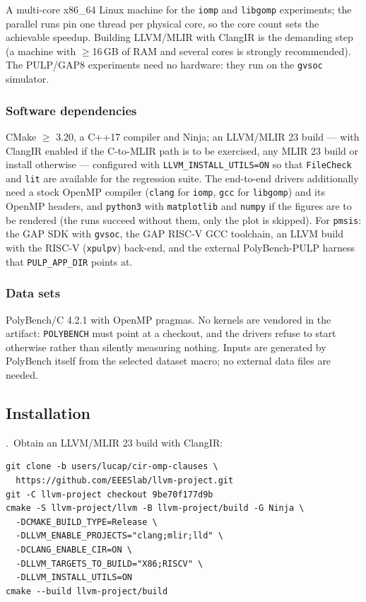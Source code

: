 A multi-core x86\_64 Linux machine for the \texttt{iomp} and \texttt{libgomp}
experiments; the parallel runs pin one thread per physical core, so the core
count sets the achievable speedup.  Building LLVM/MLIR with ClangIR is the
demanding step (a machine with $\geq$16\,GB of RAM and several cores is
strongly recommended).  The PULP/GAP8 experiments need no hardware: they run on
the \texttt{gvsoc} simulator.

\subsubsection{Software dependencies}

CMake $\geq$ 3.20, a C++17 compiler and Ninja; an LLVM/MLIR 23 build ---
with ClangIR enabled if the C-to-MLIR path is to be exercised, any MLIR 23
build or install otherwise --- configured with \texttt{LLVM\_INSTALL\_UTILS=ON}
so that \texttt{FileCheck} and \texttt{lit} are available for the regression
suite.  The end-to-end drivers additionally need a stock OpenMP compiler
(\texttt{clang} for \texttt{iomp}, \texttt{gcc} for \texttt{libgomp}) and its
OpenMP headers, and \texttt{python3} with \texttt{matplotlib} and
\texttt{numpy} if the figures are to be rendered (the runs succeed without
them, only the plot is skipped).  For \texttt{pmsis}: the GAP SDK with
\texttt{gvsoc}, the GAP RISC-V GCC toolchain, an LLVM build with the RISC-V
(\texttt{xpulpv}) back-end, and the external PolyBench-PULP harness that
\texttt{PULP\_APP\_DIR} points at.

\subsubsection{Data sets}

PolyBench/C 4.2.1 with OpenMP pragmas.  No kernels are vendored in the
artifact: \texttt{POLYBENCH} must point at a checkout, and the drivers refuse
to start otherwise rather than silently measuring nothing.  Inputs are
generated by PolyBench itself from the selected dataset macro; no external data
files are needed.

\subsection{Installation}

.\ Obtain an LLVM/MLIR 23 build with ClangIR:

{\small
\begin{verbatim}
git clone -b users/lucap/cir-omp-clauses \
  https://github.com/EEESlab/llvm-project.git
git -C llvm-project checkout 9be70f177d9b
cmake -S llvm-project/llvm -B llvm-project/build -G Ninja \
  -DCMAKE_BUILD_TYPE=Release \
  -DLLVM_ENABLE_PROJECTS="clang;mlir;lld" \
  -DCLANG_ENABLE_CIR=ON \
  -DLLVM_TARGETS_TO_BUILD="X86;RISCV" \
  -DLLVM_INSTALL_UTILS=ON
cmake --build llvm-project/build
\end{verbatim}
}

